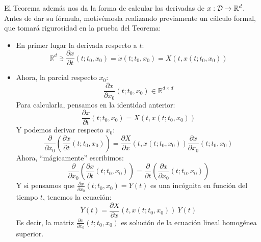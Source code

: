 \noindent
El Teorema además nos da la forma de calcular las derivadas de $x:\mathcal{D}\to \mathbb{R}^d$. Antes de dar su fórmula, motivémosla realizando previamente un cálculo formal, que tomará rigurosidad en la prueba del Teorema:
\begin{itemize}
    \item En primer lugar la derivada respecto a $t$:
        \begin{equation*}
            \mathbb{R}^d\ni \frac{\partial x}{\partial t}(t;t_0,x_0) = \dot{x}(t;t_0,x_0) = X(t,x(t;t_0,x_0))
        \end{equation*}
    \item Ahora, la parcial respecto $x_0$:
        \begin{equation*}
            \frac{\partial x}{\partial x_0}(t;t_0,x_0) \in \mathbb{R}^{d\times d}
        \end{equation*}
        Para calcularla, pensamos en la identidad anterior:
        \begin{equation*}
            \frac{\partial x}{\partial t}(t;t_0,x_0) = X(t,x(t;t_0,x_0))
        \end{equation*}
        Y podemos derivar respecto $x_0$:
        \begin{equation*}
            \frac{\partial }{\partial x_0}\left(\frac{\partial x}{\partial t}(t;t_0,x_0)\right) = \frac{\partial X}{\partial x}(t,x(t;t_0,x_0))\frac{\partial x}{\partial x_0}(t;t_0,x_0)
        \end{equation*}
        Ahora, ``mágicamente'' escribimos:
        \begin{equation*}
            \frac{\partial }{\partial x_0}\left(\frac{\partial x}{\partial t}(t;t_0,x_0)\right)  = \frac{\partial }{\partial t}\left(\frac{\partial x}{\partial x_0}(t;t_0,x_0)\right)
        \end{equation*}
        Y si pensamos que $\frac{\partial x}{\partial x_0}(t;t_0,x_0) = Y(t)$ es una incógnita en función del tiempo $t$, tenemos la ecuación:
        \begin{equation*}
            \dot{Y}(t) = \frac{\partial X}{\partial x}(t,x(t;t_0,x_0))\ Y(t)
        \end{equation*}
        Es decir, la matriz $\frac{\partial x}{\partial x_0}(t;t_0,x_0)$ es solución de la ecuación lineal homogénea superior.


\end{itemize}
